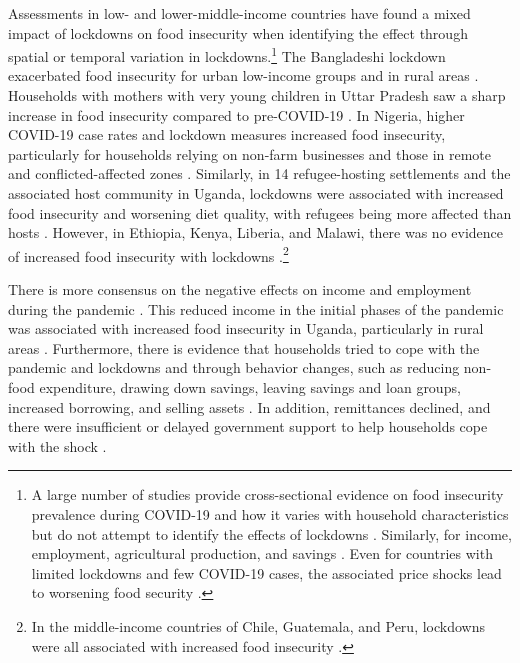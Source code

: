 \documentclass{wber}
\begin{document}
Assessments in low- and lower-middle-income countries have found a mixed
impact of lockdowns on food insecurity when identifying the effect
through spatial or temporal variation in lockdowns.\footnote{A large
  number of studies provide cross-sectional evidence on food insecurity
  prevalence during COVID-19 and how it varies with household
  characteristics but do not attempt to identify the effects of
  lockdowns
  \citep{Ceballos2020, Ceballos2021, Dasgupta2021, Egger2022, Gaitan-Rossi2021, Giacoman2021, Harris2020, Jaacks2021, Kansiime2021, Kesar2021, Kundu2021, Lee2022}.
  Similarly, for income, employment, agricultural production, and
  savings
  \citep{Balde2021, Deshpande2020, Egger2022, Harris2020, Jaacks2021, Kang2021, Kesar2021, Komin2021, Ronkko2022, Siwach2023}.
  Even for countries with limited lockdowns and few COVID-19 cases, the
  associated price shocks lead to worsening food security
  \citep{Alam2024}.} The Bangladeshi lockdown exacerbated food
insecurity for urban low-income groups and in rural areas
\citep{Hamadani2020, Ruszczyk2021}. Households with mothers with very
young children in Uttar Pradesh saw a sharp increase in food insecurity
compared to pre-COVID-19 \citep{Nguyen2021a}. In Nigeria, higher
COVID-19 case rates and lockdown measures increased food insecurity,
particularly for households relying on non-farm businesses and those in
remote and conflicted-affected zones \citep{Amare2021}. Similarly, in 14
refugee-hosting settlements and the associated host community in Uganda,
lockdowns were associated with increased food insecurity and worsening
diet quality, with refugees being more affected than hosts
\citep{Squarcina2022}. However, in Ethiopia, Kenya, Liberia, and Malawi,
there was no evidence of increased food insecurity with lockdowns
\citep{Janssens2021, Aggarwal2022, Hirvonen2021}.\footnote{In the
  middle-income countries of Chile, Guatemala, and Peru, lockdowns were
  all associated with increased food insecurity
  \citep{Ceballos2021a, Curi-Quinto2021, Giacoman2021}.}

There is more consensus on the negative effects on income and employment
during the pandemic \citep{Schotte2023, Mahmud2023}. This reduced income
in the initial phases of the pandemic was associated with increased food
insecurity in Uganda, particularly in rural areas \citep{Agamile2022}.
Furthermore, there is evidence that households tried to cope with the
pandemic and lockdowns and through behavior changes, such as reducing
non-food expenditure, drawing down savings, leaving savings and loan
groups, increased borrowing, and selling assets
\citep{Ceballos2020, Kansiime2021, Mahmud2023, Ronkko2022, Ruszczyk2021}.
In addition, remittances declined, and there were insufficient or
delayed government support to help households cope with the shock
\citep{Ceballos2021, Curi-Quinto2021, Suresh2022}.
\end{document}
